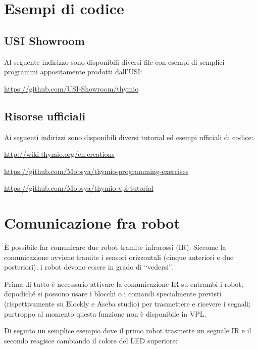 \documentclass[12pt]{article}
\begin{document}
		
\section{Esempi di codice}

	\subsection{USI Showroom}
		
		Al seguente indirizzo sono disponibili diversi file con esempi di semplici programmi appositamente prodotti dall'USI:
		
		\url{https://github.com/USI-Showroom/thymio}
		
	
	\subsection{Risorse ufficiali}
	
		Ai seguenti indirizzi sono disponibili diversi tutorial ed esempi ufficiali di codice:
	
		\url{http://wiki.thymio.org/en:creations}
		
		\url{https://github.com/Mobsya/thymio-programming-exercises}
		
		\url{https://github.com/Mobsya/thymio-vpl-tutorial}
	
	
\section{Comunicazione fra robot}\label{network}

	È possibile far comunicare due robot tramite infrarossi (IR). Siccome la comunicazione avviene tramite i sensori orizzontali (cinque anteriori e due posteriori), i robot devono essere in grado di ``vedersi''.
	
	Prima di tutto è necessario attivare la comunicazione IR su entrambi i robot, dopodiché si possono usare i blocchi o i comandi specialmente previsti (rispettivamente su Blockly e Aseba studio) per trasmettere e ricevere i segnali; purtroppo al momento questa funzione non è disponibile in VPL. 
	
	Di seguito un semplice esempio dove il primo robot trasmette un segnale IR e il secondo reagisce cambiando il colore del LED superiore: 
	
\end{document}
